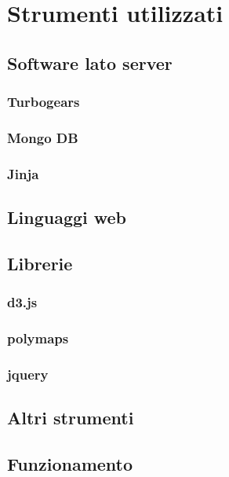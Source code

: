 \chapter{Strumenti utilizzati}
	\section{Software lato server}%
		\subsection{Turbogears}
		\subsection{Mongo DB}
		\subsection{Jinja}%
	\section{Linguaggi web}
	\section{Librerie}
		\subsection{d3.js}
		\subsection{polymaps}
		\subsection{jquery}
	\section{Altri strumenti}
			
	\section{Funzionamento}%

